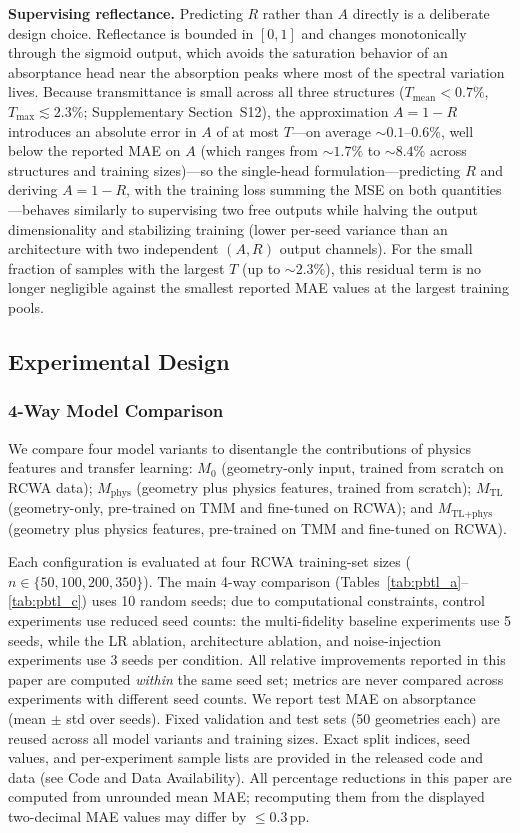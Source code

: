 \documentclass[a4paper,fleqn]{cas-sc}
\newcommand{\Mzero}{M_0}
\newcommand{\Mphys}{M_\text{phys}}
\newcommand{\Mtl}{M_\text{TL}}
\newcommand{\Mtlphys}{M_\text{TL+phys}}
\begin{document}
\textbf{Supervising reflectance.} Predicting $R$ rather than $A$ directly is a deliberate design choice. Reflectance is bounded in $[0,1]$ and changes monotonically through the sigmoid output, which avoids the saturation behavior of an absorptance head near the absorption peaks where most of the spectral variation lives. Because transmittance is small across all three structures ($T_\text{mean} < 0.7\%$, $T_\text{max} \lesssim 2.3\%$; Supplementary Section~S12), the approximation $A = 1 - R$ introduces an absolute error in $A$ of at most $T$---on average ${\sim}0.1$--$0.6\%$, well below the reported MAE on $A$ (which ranges from ${\sim}1.7\%$ to ${\sim}8.4\%$ across structures and training sizes)---so the single-head formulation---predicting $R$ and deriving $A=1-R$, with the training loss summing the MSE on both quantities---behaves similarly to supervising two free outputs while halving the output dimensionality and stabilizing training (lower per-seed variance than an architecture with two independent $(A,R)$ output channels). For the small fraction of samples with the largest $T$ (up to ${\sim}2.3\%$), this residual term is no longer negligible against the smallest reported MAE values at the largest training pools.


\subsection{Experimental Design}
\label{sec:experimental}

\subsubsection{4-Way Model Comparison}

We compare four model variants to disentangle the contributions of physics features and transfer learning: $\Mzero$ (geometry-only input, trained from scratch on RCWA data); $\Mphys$ (geometry plus physics features, trained from scratch); $\Mtl$ (geometry-only, pre-trained on TMM and fine-tuned on RCWA); and $\Mtlphys$ (geometry plus physics features, pre-trained on TMM and fine-tuned on RCWA).

Each configuration is evaluated at four RCWA training-set sizes ($n \in \{50, 100, 200, 350\}$). The main 4-way comparison (Tables~\ref{tab:pbtl_a}--\ref{tab:pbtl_c}) uses 10 random seeds; due to computational constraints, control experiments use reduced seed counts: the multi-fidelity baseline experiments use 5 seeds, while the LR ablation, architecture ablation, and noise-injection experiments use 3 seeds per condition. All relative improvements reported in this paper are computed \emph{within} the same seed set; metrics are never compared across experiments with different seed counts. We report test MAE on absorptance (mean $\pm$ std over seeds). Fixed validation and test sets (50 geometries each) are reused across all model variants and training sizes. Exact split indices, seed values, and per-experiment sample lists are provided in the released code and data (see Code and Data Availability). All percentage reductions in this paper are computed from unrounded mean MAE; recomputing them from the displayed two-decimal MAE values may differ by ${\leq}0.3$\,pp.
\end{document}
